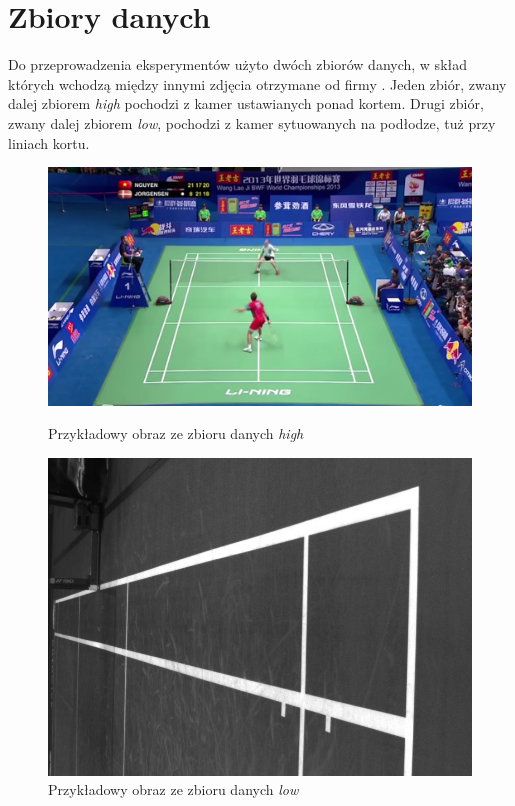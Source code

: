 \section{Zbiory danych}
\label{sec:zbiory}
Do przeprowadzenia eksperymentów użyto dwóch zbiorów danych, w skład których wchodzą między innymi zdjęcia otrzymane od firmy \blue{}.
Jeden zbiór, zwany dalej zbiorem \textit{high} pochodzi z kamer ustawianych ponad kortem.
Drugi zbiór, zwany dalej zbiorem \textit{low}, pochodzi z kamer sytuowanych na podłodze, tuż przy liniach kortu.


\begin{figure}[!htb]
    \includegraphics[width=\linewidth]{../../badminton/datasets/high/split/test_court2-00002.png}
    \caption{Przykładowy obraz ze zbioru danych \textit{high}}
  \endminipage\hfill
    \includegraphics[width=\linewidth]{../../badminton/datasets/low/split/1564909032792410075.jpg}
    \caption{Przykładowy obraz ze zbioru danych \textit{low}}
  \endminipage\hfill
\end{figure}

